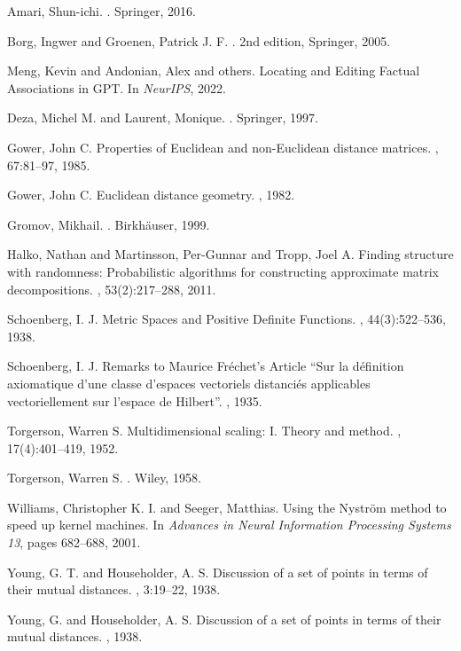 \documentclass[11pt]{article}
\newcommand{\1}{\mathbf{1}}
\begin{document}
\begin{thebibliography}{99}

Amari, Shun-ichi.
.
\newblock Springer, 2016.

Borg, Ingwer and Groenen, Patrick J. F.
.
\newblock 2nd edition, Springer, 2005.

Meng, Kevin and Andonian, Alex and others.
\newblock Locating and Editing Factual Associations in GPT.
\newblock In {\em NeurIPS}, 2022.

Deza, Michel M. and Laurent, Monique.
.
\newblock Springer, 1997.

Gower, John C.
\newblock Properties of Euclidean and non-Euclidean distance matrices.
, 67:81--97, 1985.

Gower, John C.
\newblock Euclidean distance geometry.
, 1982.

Gromov, Mikhail.
.
\newblock Birkh\"auser, 1999.

Halko, Nathan and Martinsson, Per-Gunnar and Tropp, Joel A.
\newblock Finding structure with randomness: Probabilistic algorithms for constructing approximate matrix decompositions.
, 53(2):217--288, 2011.

Schoenberg, I. J.
\newblock Metric Spaces and Positive Definite Functions.
, 44(3):522--536, 1938.

Schoenberg, I. J.
\newblock Remarks to Maurice Fr\'echet's Article ``Sur la d\'efinition axiomatique d'une classe d'espaces vectoriels distanci\'es applicables vectoriellement sur l'espace de Hilbert''.
, 1935.

Torgerson, Warren S.
\newblock Multidimensional scaling: I. Theory and method.
, 17(4):401--419, 1952.

Torgerson, Warren S.
.
\newblock Wiley, 1958.

Williams, Christopher K. I. and Seeger, Matthias.
\newblock Using the Nystr\"om method to speed up kernel machines.
\newblock In {\em Advances in Neural Information Processing Systems 13}, pages 682--688, 2001.

Young, G. T. and Householder, A. S.
\newblock Discussion of a set of points in terms of their mutual distances.
, 3:19--22, 1938.

Young, G. and Householder, A. S.
\newblock Discussion of a set of points in terms of their mutual distances.
, 1938.

\end{thebibliography}
\end{document}
